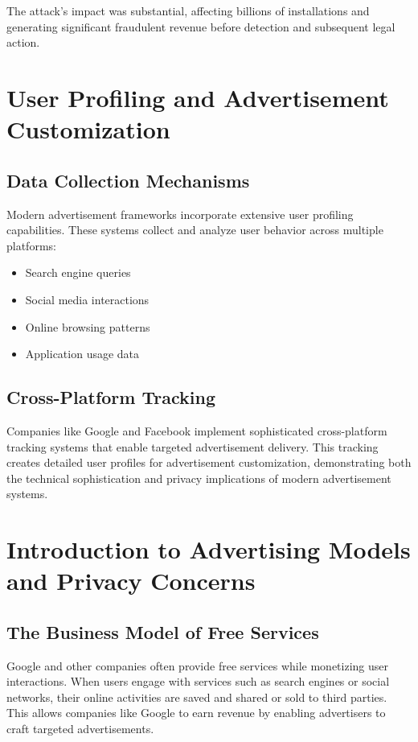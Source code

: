 \documentclass{article}
\begin{document}
The attack's impact was substantial, affecting billions of installations and generating significant fraudulent revenue before detection and subsequent legal action.

\section{User Profiling and Advertisement Customization}
\subsection{Data Collection Mechanisms}
Modern advertisement frameworks incorporate extensive user profiling capabilities. These systems collect and analyze user behavior across multiple platforms:
\begin{itemize}
    \item Search engine queries
    \item Social media interactions
    \item Online browsing patterns
    \item Application usage data
\end{itemize}

\subsection{Cross-Platform Tracking}
Companies like Google and Facebook implement sophisticated cross-platform tracking systems that enable targeted advertisement delivery. This tracking creates detailed user profiles for advertisement customization, demonstrating both the technical sophistication and privacy implications of modern advertisement systems.


\section{Introduction to Advertising Models and Privacy Concerns}

\subsection{The Business Model of Free Services}
Google and other companies often provide free services while monetizing user interactions. When users engage with services such as search engines or social networks, their online activities are saved and shared or sold to third parties. This allows companies like Google to earn revenue by enabling advertisers to craft targeted advertisements.
\end{document}
